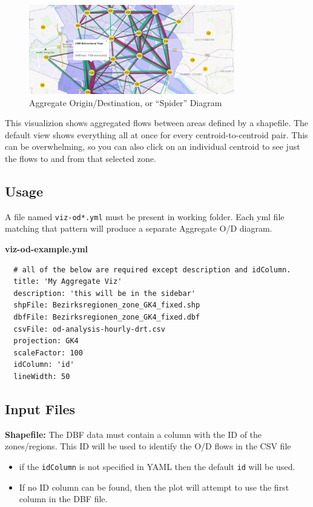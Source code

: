 \begin{figure}[H]
  \centering
  \includegraphics[width=0.8\textwidth]{assets/aggregate-od.jpg}
  \caption{Aggregate Origin/Destination, or ``Spider'' Diagram}
\end{figure}

This visualizion shows aggregated flows between areas defined by a shapefile.
The default view shows everything all at once for every
centroid-to-centroid pair. This can be overwhelming, so you can also
click on an individual centroid to see just the flows to and from that
selected zone.

\hypertarget{usage}{%
\subsection{Usage}}

A file named \texttt{viz-od*.yml} must be present in working folder.
Each yml file matching that pattern will produce a separate Aggregate
O/D diagram.

\textbf{viz-od-example.yml}

\begin{lstlisting}
  # all of the below are required except description and idColumn.
  title: 'My Aggregate Viz'
  description: 'this will be in the sidebar'
  shpFile: Bezirksregionen_zone_GK4_fixed.shp
  dbfFile: Bezirksregionen_zone_GK4_fixed.dbf
  csvFile: od-analysis-hourly-drt.csv
  projection: GK4
  scaleFactor: 100
  idColumn: 'id'
  lineWidth: 50
\end{lstlisting}

\hypertarget{input-files}{%
\subsection{Input Files}}

\textbf{Shapefile:} The DBF data must contain a column with the ID of
the zones/regions. This ID will be used to identify the O/D flows in the
CSV file

\begin{itemize}
\tightlist
\item
  if the \texttt{idColumn} is not specified in YAML then the default
  \texttt{id} will be used.
\item
  If no ID column can be found, then the plot will attempt to use the
  first column in the DBF file.
\end{itemize}

